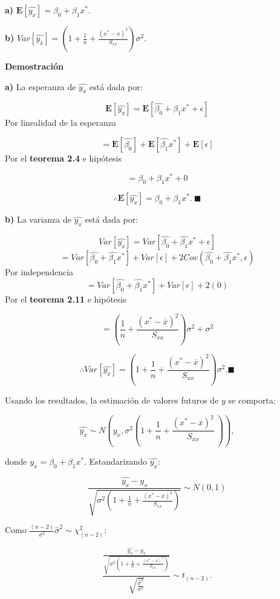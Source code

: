 \documentclass[
  a4paper,
  oneside,
  openany]{book}
\begin{document}
\textbf{a)} \(\mathbf{E}\left[\hat{y_{x}}\right]=\beta_{0}+\beta_{1}x^*.\)

\textbf{b)} \(Var\left[\hat{y_{x}}\right]=\left(1+ \frac{1}{n}+\frac{(x^*-\overline{x})^2}{S_{xx}}\right)\sigma^2.\)

\textbf{Demostración}

\textbf{a)} La esperanza de \(\hat{y_{x}}\) está dada por:

\[\mathbf{E}\left[\hat{y_{x}}\right]=\mathbf {E}\left[\hat{\beta_{0}}+\hat{\beta_{1}}x^*+ \epsilon\right]\]
Por linealidad de la esperanza

\[=\mathbf{E}\left[\hat{\beta_{0}}\right]+\mathbf{E}\left[\hat{\beta_{1}}x^*\right]+ \mathbf{E}\left[\epsilon\right]\]
Por el \textbf{teorema 2.4} e hipótesis

\[=\beta_{0}+\beta_{1}x^*+0\]

\[\therefore \mathbf{E}\left[\hat{y_{x}}\right]=\beta_{0}+\beta_{1}x^*. \ \blacksquare\]

\textbf{b)} La varianza de \(\hat{y_{x}}\) está dada por:

\[Var\left[\hat{y_{x}}\right]=Var\left[\hat{\beta_{0}}+\hat{\beta_{1}}x^*+\epsilon\right]\]
\[=Var\left[\hat{\beta_{0}}+\hat{\beta_{1}}x^*\right]+Var\left[\epsilon\right]+2Cov(\hat{\beta_{0}}+\hat{\beta_{1}}x^*,\epsilon)\]
Por independencia
\[=Var\left[\hat{\beta_{0}}+\hat{\beta_{1}}x^*\right]+Var\left[\epsilon\right]+2(0)\]
Por el \textbf{teorema 2.11} e hipótesis

\[=\left(\frac{1}{n}+\frac{(x^*-\overline{x})^2}{S_{xx}}\right)\sigma^2+\sigma^2\]

\[\therefore Var\left[\hat{y_{x}}\right]=\left(1+ \frac{1}{n}+\frac{(x^*-\overline{x})^2}{S_{xx}}\right)\sigma^2. \blacksquare\]

Usando los resultados, la estimación de valores futuros de \(y\) se comporta:

\[\hat{y_{x}} \sim N \left(y_{x},\sigma^2\left(1+ \frac{1}{n}+\frac{(x^*-\overline{x})^2}{S_{xx}} \ \right)\right),\]

donde \(y_{x}=\beta_{0}+\beta_{1}x^*.\) Estandarizando \(\hat{y_{x}}:\)

\[\frac{\hat{y_{x}}-y_{x}}{\sqrt{\sigma^2\left(1+ \frac{1}{n}+\frac{(x^*-\overline{x})^2}{S_{xx}}\right)}}\sim N (0,1)\]

Como \(\frac{(n-2)}{\sigma^2}\hat{\sigma}^2 \sim \chi^2_{(n-2)}\):

\[\frac{\frac{\hat{y_{x}}-y_{x}}{\sqrt{\sigma^2\left(1+ \frac{1}{n}+\frac{(x^*-\overline{x})^2}{S_{xx}}\right)}}}{\sqrt{\frac{\hat{\sigma}^2}{\sigma^2}}}\sim t_{(n-2)}.\]
\end{document}
